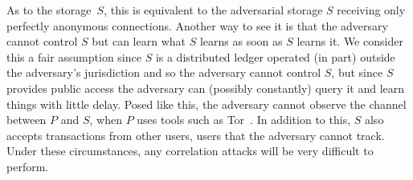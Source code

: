 As to the storage~\(S\), this is equivalent to the adversarial storage \(S\) 
receiving only perfectly anonymous connections.
Another way to see it is that the adversary cannot control \(S\) but can learn 
what \(S\) learns as soon as \(S\) learns it.
We consider this a fair assumption since \(S\) is a distributed ledger operated 
(in part) outside the adversary's jurisdiction and so the adversary cannot 
control \(S\), but since \(S\) provides public access the adversary can 
(possibly constantly) query it and learn things with little delay.
Posed like this, the adversary cannot observe the channel between \(P\) and 
\(S\), \eg when \(P\) uses tools such as Tor~\cite{Tor}.
In addition to this, \(S\) also accepts transactions from other users, users 
that the adversary cannot track.
Under these circumstances, any correlation attacks will be very difficult to 
perform.

